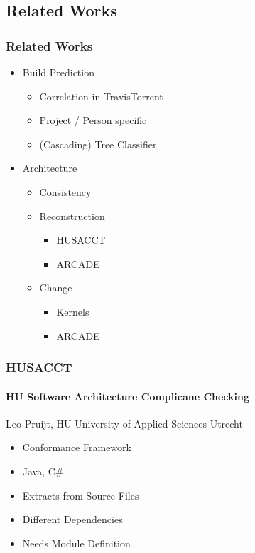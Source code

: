 \documentclass{beamer}
\begin{document}
\subsection{Related Works}
\begin{frame}
\frametitle{Related Works}


\begin{itemize}
	\item Build Prediction
	\begin{itemize}
		\item Correlation in TravisTorrent
		\item Project / Person specific
		\item (Cascading) Tree Classifier
	\end{itemize}
	\pause
	\item Architecture
	\begin{itemize}
		\item Consistency
		\item Reconstruction
		\begin{itemize}
			\item HUSACCT
			\item ARCADE
		\end{itemize}
		\item Change
		\begin{itemize}
			\item Kernels
			\item ARCADE
		\end{itemize}
	\end{itemize}
\end{itemize}

\end{frame}

\begin{frame}
	\frametitle{HUSACCT}
	\framesubtitle{HU Software Architecture Complicane Checking}
	
	Leo Pruijt, HU University of Applied Sciences Utrecht
	
	\begin{itemize}
			\item Conformance Framework
			\item Java, C\#
			\item Extracts from Source Files
			\item Different Dependencies
			\item Needs Module Definition
	\end{itemize}

\end{frame}
\end{document}
